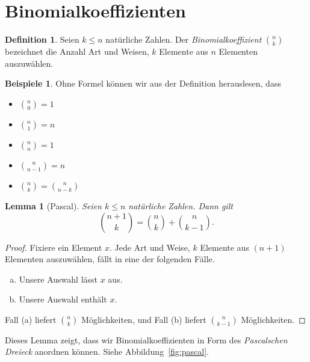 \documentclass[12pt,a4paper]{article}
\newtheorem*{lemma}{Lemma}
\theoremstyle{definition}
\newtheorem*{definition}{Definition}
\newtheorem*{examples}{Beispiele}
\begin{document}
\section{Binomialkoeffizienten}
\begin{definition}
  Seien $k \leq n$ natürliche Zahlen.
  Der \textit{Binomialkoeffizient} $\binom{n}{k}$ bezeichnet die Anzahl
  Art und Weisen, $k$ Elemente aus $n$ Elementen auszuwählen.
\end{definition}

\begin{examples}
  Ohne Formel können wir aus der Definition herauslesen, dass
  \begin{itemize}
    \item $\binom{n}{0} = 1$
    \item $\binom{n}{1} = n$
    \item $\binom{n}{n} = 1$
    \item $\binom{n}{n-1} = n$
    \item $\binom{n}{k} = \binom{n}{n-k}$
  \end{itemize}
\end{examples}

\begin{lemma}[Pascal]
  Seien $k \leq n$ natürliche Zahlen. Dann gilt
  \[
    \binom{n+1}{k} = \binom{n}{k} + \binom{n}{k-1}.
  \]
\end{lemma}

\begin{proof}
  Fixiere ein Element $x$. Jede Art und Weise,
  $k$ Elemente aus $(n+1)$ Elementen auszuwählen,
  fällt in eine der folgenden Fälle.
  \begin{enumerate}[(a)]
    \item Unsere Auswahl lässt $x$ aus.
    \item Unsere Auswahl enthält $x$.
  \end{enumerate}
  Fall (a) liefert $\binom{n}{k}$ Möglichkeiten,
  und Fall (b) liefert $\binom{n}{k-1}$ Möglichkeiten.
\end{proof}

Dieses Lemma zeigt, dass wir Binomialkoeffizienten
in Form des \textit{Pascalschen Dreieck}
anordnen können. Siehe Abbildung~\ref{fig:pascal}.
\end{document}
